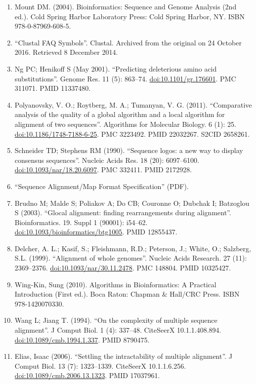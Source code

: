 \documentclass[
]{book}
\providecommand{\tightlist}{%
  \setlength{\itemsep}{0pt}\setlength{\parskip}{0pt}}
\begin{document}
\begin{enumerate}
\def\labelenumi{\arabic{enumi}.}
\tightlist
\item
  Mount DM. (2004). Bioinformatics: Sequence and Genome Analysis (2nd ed.). Cold Spring Harbor Laboratory Press: Cold Spring Harbor, NY. ISBN 978-0-87969-608-5.
\item
  ``Clustal FAQ Symbols''. Clustal. Archived from the original on 24 October 2016. Retrieved 8 December 2014.
\item
  Ng PC; Henikoff S (May 2001). ``Predicting deleterious amino acid substitutions''. Genome Res. 11 (5): 863--74. \url{doi:10.1101/gr.176601}. PMC 311071. PMID 11337480.
\item
  Polyanovsky, V. O.; Roytberg, M. A.; Tumanyan, V. G. (2011). ``Comparative analysis of the quality of a global algorithm and a local algorithm for alignment of two sequences''. Algorithms for Molecular Biology. 6 (1): 25. \url{doi:10.1186/1748-7188-6-25}. PMC 3223492. PMID 22032267. S2CID 2658261.
\item
  Schneider TD; Stephens RM (1990). ``Sequence logos: a new way to display consensus sequences''. Nucleic Acids Res. 18 (20): 6097--6100. \url{doi:10.1093/nar/18.20.6097}. PMC 332411. PMID 2172928.
\item
  ``Sequence Alignment/Map Format Specification'' (PDF).
\item
  Brudno M; Malde S; Poliakov A; Do CB; Couronne O; Dubchak I; Batzoglou S (2003). ``Glocal alignment: finding rearrangements during alignment''. Bioinformatics. 19. Suppl 1 (90001): i54--62. \url{doi:10.1093/bioinformatics/btg1005}. PMID 12855437.
\item
  Delcher, A. L.; Kasif, S.; Fleishmann, R.D.; Peterson, J.; White, O.; Salzberg, S.L. (1999). ``Alignment of whole genomes''. Nucleic Acids Research. 27 (11): 2369--2376. \url{doi:10.1093/nar/30.11.2478}. PMC 148804. PMID 10325427.
\item
  Wing-Kin, Sung (2010). Algorithms in Bioinformatics: A Practical Introduction (First ed.). Boca Raton: Chapman \& Hall/CRC Press. ISBN 978-1420070330.
\item
  Wang L; Jiang T. (1994). ``On the complexity of multiple sequence alignment''. J Comput Biol. 1 (4): 337--48. CiteSeerX 10.1.1.408.894. \url{doi:10.1089/cmb.1994.1.337}. PMID 8790475.
\item
  Elias, Isaac (2006). ``Settling the intractability of multiple alignment''. J Comput Biol. 13 (7): 1323--1339. CiteSeerX 10.1.1.6.256. \url{doi:10.1089/cmb.2006.13.1323}. PMID 17037961.

\end{enumerate}
\end{document}
